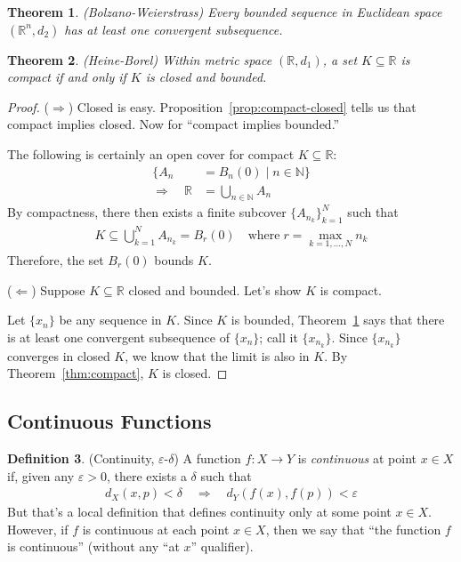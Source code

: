 \documentclass[12pt]{article}
\theoremstyle{plain}
\newtheorem{thm}{Theorem}[section]
\theoremstyle{definition}
\newtheorem{defn}[thm]{Definition}
\theoremstyle{remark}
\newcommand{\R}{\mathbb{R}}
\begin{document}
\begin{thm}{\emph{(Bolzano-Weierstrass)}}
\label{thm:bolzano-weierstrass}
Every bounded sequence in Euclidean space $(\R^n,d_2)$ has at
least one convergent subsequence.
\end{thm}

\begin{thm}{\emph{(Heine-Borel)}}
\label{thm:heine-borel}
Within metric space $(\R,d_1)$, a set $K\subseteq \R$ is
compact if and only if $K$ is closed and bounded.
\end{thm}
\begin{proof}
($\Rightarrow$)
Closed is easy. Proposition~\ref{prop:compact-closed} tells us that
compact implies closed. Now for ``compact implies bounded.''

The following is certainly an open cover for compact
$K\subseteq \R$:
\begin{align*}
  \{ A_n &= B_n(0) \; | \; n \in \mathbb{N}\}\\
  \Rightarrow\quad
   \R &= \bigcup_{n\in \mathbb{N}} A_n
\end{align*}
By compactness, there then exists a finite subcover
$\{A_{n_k}\}_{k=1}^N$ such that
\begin{align*}
  K \subseteq \bigcup_{k=1}^N A_{n_k}
  = B_r(0)
  \quad \text{where} \;r=\max_{k=1,\ldots,N} n_k
\end{align*}
Therefore, the set $B_r(0)$ bounds $K$.

($\Leftarrow$) Suppose $K\subseteq \R$ closed and bounded. Let's
show $K$ is compact.

Let $\{x_n\}$ be any sequence in $K$. Since $K$ is bounded,
Theorem~\ref{thm:bolzano-weierstrass} says that there is at least one
convergent subsequence of $\{x_n\}$; call it $\{x_{n_k}\}$.  Since
$\{x_{n_k}\}$ converges in closed $K$, we know that the limit is also in
$K$. By Theorem~\ref{thm:compact}, $K$ is closed.
\end{proof}


\subsection{Continuous Functions}

\begin{defn}{(Continuity, $\varepsilon$-$\delta$)}
\label{defn:cts}
A function $f:X\rightarrow Y$ is \emph{continuous} at point $x\in X$ if,
given any $\varepsilon>0$, there exists a $\delta$ such that
\begin{align*}
  d_X(x,p) < \delta \quad \Rightarrow\quad
  d_Y(f(x),f(p))<\varepsilon
\end{align*}
But that's a local definition that defines continuity only at some point
$x\in X$. However, if $f$ is continuous at each point $x\in X$, then we
say that ``the function $f$ is continuous'' (without any ``at $x$''
qualifier).
\end{defn}
\end{document}
